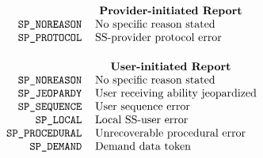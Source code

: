 
\normalsize
\[\begin{tabular}{rp{3.0in}}
	\multicolumn{2}{c}{\bf Provider-initiated Report}\\
\tt SP\_NOREASON&	No specific reason stated\\
\tt SP\_PROTOCOL&	SS-provider protocol error\\[0.2in]
	\multicolumn{2}{c}{\bf User-initiated Report}\\
\tt SP\_NOREASON&	No specific reason stated\\
\tt SP\_JEOPARDY&	User receiving ability jeopardized\\
\tt SP\_SEQUENCE&	User sequence error\\
\tt SP\_LOCAL&		Local SS-user error\\
\tt SP\_PROCEDURAL&	Unrecoverable procedural error\\
\tt SP\_DEMAND&		Demand data token
\end{tabular}\]
